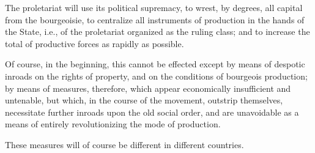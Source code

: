 The proletariat will use its political supremacy, to wrest, by degrees, all capital from the bourgeoisie, to centralize all instruments of production in the hands of the State, i.e., of the proletariat organized as the ruling class; and to increase the total of productive forces as rapidly as possible.

Of course, in the beginning, this cannot be effected except by means of despotic inroads on the rights of property, and on the conditions of bourgeois production; by means of measures, therefore, which appear economically insufficient and untenable, but which, in the course of the movement, outstrip themselves, necessitate further inroads upon the old social order, and are unavoidable as a means of entirely revolutionizing the mode of production.

These measures will of course be different in different countries.

